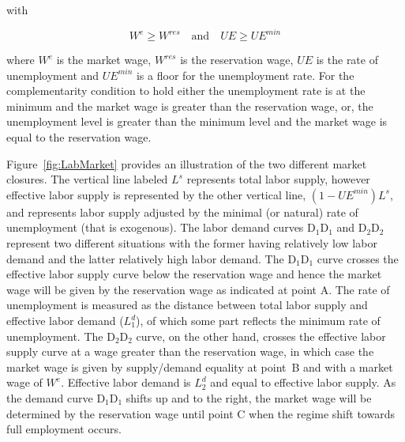 \documentclass[11pt,letterpaper]{report}
\begin{document}
\noindent with

\[
W^e \ge \mathit{W}^{\mathit{res}} \quad \text{and} \quad
\mathit{UE} \ge \mathit{UE}^{\mathit{min}}
\]

\noindent where $W^e$ is the market wage, $\mathit{W}^{\mathit{res}}$ is the
reservation wage, $\mathit{UE}$ is the rate of unemployment and
$\mathit{UE}^{\mathit{min}}$ is a floor for the unemployment rate. For the
complementarity condition to hold either the unemployment rate is at the minimum
and the market wage is greater than the reservation wage, or, the unemployment
level is greater than the minimum level and the market wage is equal to the
reservation wage.

Figure~\ref{fig:LabMarket} provides an illustration of the two different market
closures. The vertical line labeled $L^s$ represents total labor supply, however
effective labor supply is represented by the other vertical line,
$(1-\mathit{UE}^{\mathit{min}})L^s$, and represents labor supply adjusted by the
minimal (or natural) rate of unemployment (that is exogenous). The labor demand
curves $\textrm{D}_1\textrm{D}_1$ and $\textrm{D}_2\textrm{D}_2$ represent two
different situations with the former having relatively low labor demand and the
latter relatively high labor demand. The $\textrm{D}_1\textrm{D}_1$ curve
crosses the effective labor supply curve below the reservation wage and hence
the market wage will be given by the reservation wage as indicated at point A.
The rate of unemployment is measured as the distance between total labor supply
and effective labor demand ($L^d_1$), of which some part reflects the minimum
rate of unemployment. The $\textrm{D}_2\textrm{D}_2$ curve, on the other hand,
crosses the effective labor supply curve at a wage greater than the reservation
wage, in which case the market wage is given by supply/demand equality at
point~B and with a market wage of $W^e$. Effective labor demand is $L^d_2$ and
equal to effective labor supply. As the demand curve $\textrm{D}_1\textrm{D}_1$
shifts up and to the right, the market wage will be determined by the
reservation wage until point C when the regime shift towards full employment
occurs.
\end{document}
